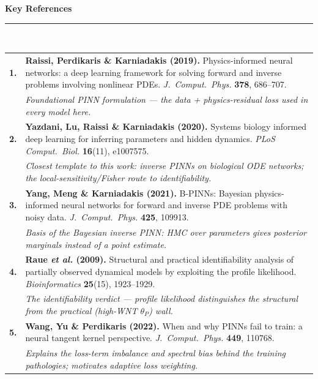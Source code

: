 \documentclass[border=0pt]{standalone}
\newcommand{\refnum}[1]{\textcolor{sablue}{\bfseries #1}}
\newcommand{\reftitle}[1]{\textbf{#1}}
\newcommand{\refwhy}[1]{{\small\itshape\textcolor{sagrey}{#1}}}
\begin{document}
\begin{minipage}{22cm}
\setlength{\parskip}{0pt}
\centering
{\Huge\bfseries Key References}\\[2pt]
{\color{sablue}\rule{22cm}{2.2pt}}\\[10pt]

\raggedright
\renewcommand{\arraystretch}{1.35}
\begin{tabular}{@{}p{0.9cm}@{}p{20.6cm}@{}}

\refnum{1.} &
\reftitle{Raissi, Perdikaris \& Karniadakis (2019).} Physics-informed neural
networks: a deep learning framework for solving forward and inverse problems
involving nonlinear PDEs. \emph{J.\ Comput.\ Phys.} \textbf{378}, 686--707.\\
& \refwhy{Foundational PINN formulation --- the data + physics-residual loss used in every model here.}\\[4pt]

\refnum{2.} &
\reftitle{Yazdani, Lu, Raissi \& Karniadakis (2020).} Systems biology informed
deep learning for inferring parameters and hidden dynamics.
\emph{PLoS Comput.\ Biol.} \textbf{16}(11), e1007575.\\
& \refwhy{Closest template to this work: inverse PINNs on biological ODE networks; the local-sensitivity/Fisher route to identifiability.}\\[4pt]

\refnum{3.} &
\reftitle{Yang, Meng \& Karniadakis (2021).} B-PINNs: Bayesian physics-informed
neural networks for forward and inverse PDE problems with noisy data.
\emph{J.\ Comput.\ Phys.} \textbf{425}, 109913.\\
& \refwhy{Basis of the Bayesian inverse PINN: HMC over parameters gives posterior marginals instead of a point estimate.}\\[4pt]

\refnum{4.} &
\reftitle{Raue \emph{et al.} (2009).} Structural and practical identifiability
analysis of partially observed dynamical models by exploiting the profile
likelihood. \emph{Bioinformatics} \textbf{25}(15), 1923--1929.\\
& \refwhy{The identifiability verdict --- profile likelihood distinguishes the structural from the practical (high-WNT $\theta_P$) wall.}\\[4pt]

\refnum{5.} &
\reftitle{Wang, Yu \& Perdikaris (2022).} When and why PINNs fail to train:
a neural tangent kernel perspective. \emph{J.\ Comput.\ Phys.} \textbf{449}, 110768.\\
& \refwhy{Explains the loss-term imbalance and spectral bias behind the training pathologies; motivates adaptive loss weighting.}\\[4pt]


\end{tabular}
\end{minipage}
\end{document}
